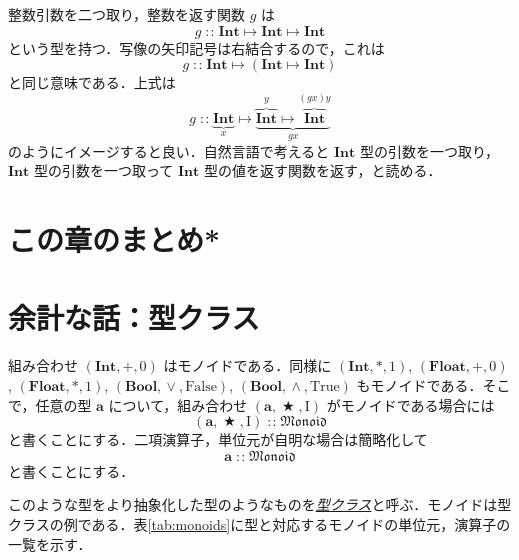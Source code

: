 \documentclass[a4paper]{jsbook}
\newcommand{\keyword}[1]{{\underline{\emph{#1}}}}
\newcommand{\mSpecialConst}[1]{\mathrm{#1}} %
\newcommand{\mTrue}{\mSpecialConst{True}}
\newcommand{\mFalse}{\mSpecialConst{False}}
\newcommand{\mOne}{\mSpecialConst{I}}
\newcommand{\mType}[1]{\mathbf{#1}}
\newcommand{\mBoolType}{\mType{Bool}}
\newcommand{\mIntType}{\mType{Int}}
\newcommand{\mFloatType}{\mType{Float}}
\newcommand{\mSpecialTypeClass}[1]{\mathfrak{#1}} %
\newcommand{\mMonoidTypeClass}{\mSpecialTypeClass{Monoid}}
\newcommand{\mTupleWith}[1]{\left(#1\right)}
\DeclareMathOperator{\mIn}{{:\!:}}
\DeclareMathOperator{\mMapsTo}{\mapsto}
\DeclareMathOperator{\mBinOp}{\bigstar}
\DeclareMathOperator{\mLogicalAnd}{\wedge}
\DeclareMathOperator{\mLogicalOr}{\vee}
\newcommand{\mProjection}[2]{#1\mMapsTo#2}
\begin{document}
整数引数を二つ取り，整数を返す関数 $g$ は
\begin{equation}
g\mIn\mProjection{\mIntType}{\mProjection{\mIntType}{\mIntType}}
\end{equation}
という型を持つ．写像の矢印記号は右結合するので，これは
\begin{equation}
g\mIn\mProjection{\mIntType}{\left(\mProjection{\mIntType}{\mIntType}\right)}
\end{equation}
と同じ意味である．上式は
\begin{equation*}
g\mIn
\underbrace{\mIntType}_x
\mMapsTo
\underbrace{\overbrace{\mIntType}^y
\mMapsTo\overbrace{\mIntType}^{(gx)y}}_{gx}
\end{equation*}
のようにイメージすると良い．自然言語で考えると $\mIntType$ 型の引数を一つ取り，$\mIntType$ 型の引数を一つ取って $\mIntType$ 型の値を返す関数を返す，と読める．

\section*{この章のまとめ*}


\section{余計な話：型クラス}

組み合わせ $\mTupleWith{\mIntType,+,0}$ はモノイドである．同様に $\mTupleWith{\mIntType,*,1}$, $\mTupleWith{\mFloatType,+,0}$, $\mTupleWith{\mFloatType,*,1}$, $\mTupleWith{\mBoolType,\mLogicalOr,\mFalse}$, $\mTupleWith{\mBoolType,\mLogicalAnd,\mTrue}$ もモノイドである．そこで，任意の型 $\mType{a}$ について，組み合わせ $\mTupleWith{\mType{a},\mBinOp,\mOne}$ がモノイドである場合には
\begin{equation}
\mTupleWith{\mType{a},\mBinOp,\mOne}\mIn\mMonoidTypeClass
\end{equation}
と書くことにする．二項演算子，単位元が自明な場合は簡略化して
\begin{equation}
\mType{a}\mIn\mMonoidTypeClass
\end{equation}
と書くことにする．

このような型をより抽象化した型のようなものを\keyword{型クラス}と呼ぶ．モノイドは型クラスの例である．表\ref{tab:monoids}に型と対応するモノイドの単位元，演算子の一覧を示す．
\end{document}
